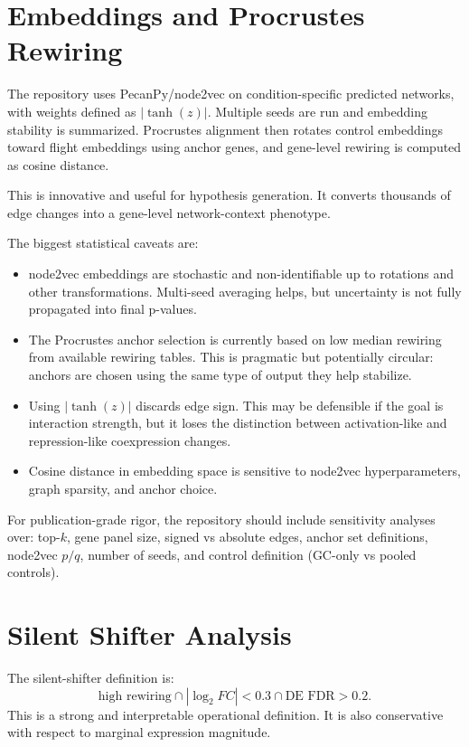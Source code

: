 \documentclass[11pt]{article}
\begin{document}
\section{Embeddings and Procrustes Rewiring}

The repository uses PecanPy/node2vec on condition-specific predicted networks, with weights defined as $|\tanh(z)|$.  Multiple seeds are run and embedding stability is summarized.  Procrustes alignment then rotates control embeddings toward flight embeddings using anchor genes, and gene-level rewiring is computed as cosine distance.

This is innovative and useful for hypothesis generation.  It converts thousands of edge changes into a gene-level network-context phenotype.

The biggest statistical caveats are:
\begin{itemize}[leftmargin=1.5em]
    \item node2vec embeddings are stochastic and non-identifiable up to rotations and other transformations.  Multi-seed averaging helps, but uncertainty is not fully propagated into final p-values.
    \item The Procrustes anchor selection is currently based on low median rewiring from available rewiring tables.  This is pragmatic but potentially circular: anchors are chosen using the same type of output they help stabilize.
    \item Using $|\tanh(z)|$ discards edge sign.  This may be defensible if the goal is interaction strength, but it loses the distinction between activation-like and repression-like coexpression changes.
    \item Cosine distance in embedding space is sensitive to node2vec hyperparameters, graph sparsity, and anchor choice.
\end{itemize}

For publication-grade rigor, the repository should include sensitivity analyses over: top-$k$, gene panel size, signed vs absolute edges, anchor set definitions, node2vec $p/q$, number of seeds, and control definition (GC-only vs pooled controls).

\section{Silent Shifter Analysis}

The silent-shifter definition is:
\[
\text{high rewiring} \cap |\log_2 FC| < 0.3 \cap \text{DE FDR} > 0.2.
\]
This is a strong and interpretable operational definition.  It is also conservative with respect to marginal expression magnitude.
\end{document}

